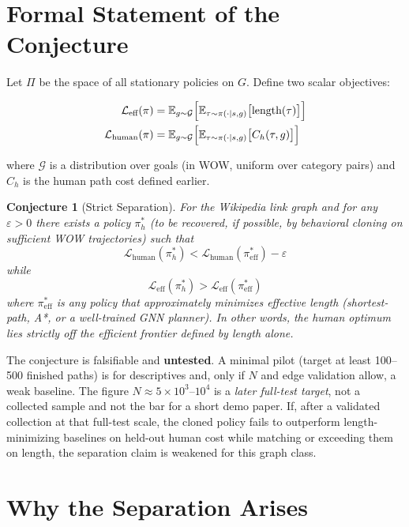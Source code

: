 \documentclass[11pt,a4paper]{report}
\newtheorem{conjecture}{Conjecture}[chapter]
\begin{document}
\section{Formal Statement of the Conjecture}

Let \(\Pi\) be the space of all stationary policies on \(G\). Define two scalar objectives:

\begin{align}
\mathcal{L}_{\text{eff}}(\pi) &= \mathbb{E}_{g \sim \mathcal{G}} \Bigl[ \mathbb{E}_{\tau \sim \pi(\cdot \mid s,g)} \bigl[ \text{length}(\tau) \bigr] \Bigr] \\
\mathcal{L}_{\text{human}}(\pi) &= \mathbb{E}_{g \sim \mathcal{G}} \Bigl[ \mathbb{E}_{\tau \sim \pi(\cdot \mid s,g)} \bigl[ C_h(\tau, g) \bigr] \Bigr]
\end{align}

where \(\mathcal{G}\) is a distribution over goals (in WOW, uniform over category pairs) and \(C_h\) is the human path cost defined earlier.

\begin{conjecture}[Strict Separation]
For the Wikipedia link graph and for any \(\varepsilon > 0\) there exists a policy \(\pi_h^*\) (to be recovered, if possible, by behavioral cloning on sufficient WOW trajectories) such that
\[
\mathcal{L}_{\text{human}}(\pi_h^*) < \mathcal{L}_{\text{human}}(\pi_{\text{eff}}^*) - \varepsilon
\]
while
\[
\mathcal{L}_{\text{eff}}(\pi_h^*) > \mathcal{L}_{\text{eff}}(\pi_{\text{eff}}^*)
\]
where \(\pi_{\text{eff}}^*\) is any policy that approximately minimizes effective length (shortest-path, A*, or a well-trained GNN planner). In other words, the human optimum lies strictly off the efficient frontier defined by length alone.
\end{conjecture}

The conjecture is falsifiable and \textbf{untested}. A minimal pilot (target at least 100--500 finished paths) is for descriptives and, only if \(N\) and edge validation allow, a weak baseline. The figure \(N \approx 5 \times 10^3\)--\(10^4\) is a \textit{later full-test target}, not a collected sample and not the bar for a short demo paper. If, after a validated collection at that full-test scale, the cloned policy fails to outperform length-minimizing baselines on held-out human cost while matching or exceeding them on length, the separation claim is weakened for this graph class.

\section{Why the Separation Arises}
\end{document}
